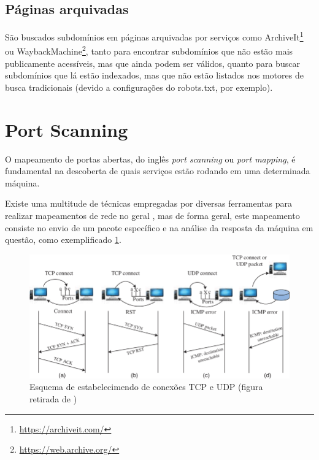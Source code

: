         \subsection{Páginas arquivadas} São buscados subdomínios em páginas arquivadas por serviços como ArchiveIt\footnote{\url{https://archiveit.com/}} ou WaybackMachine\footnote{\url{https://web.archive.org/}}, tanto para encontrar subdomínios que não estão mais publicamente acessíveis, mas que ainda podem ser válidos, quanto para buscar subdomínios que lá estão indexados, mas que não estão listados nos motores de busca tradicionais (devido a configurações do robots.txt, por exemplo).


\section{Port Scanning}

O mapeamento de portas abertas, do inglês \textit{port scanning} ou \textit{port mapping}, é fundamental na descoberta de quais serviços estão rodando em uma determinada máquina. 

Existe uma multitude de técnicas empregadas por diversas ferramentas para realizar mapeamentos de rede no geral \citep{de1999review}, mas de forma geral, este mapeamento consiste no envio de um pacote específico e na análise da resposta da máquina em questão, como exemplificado 
\ref{fig:tcpudp}.

\begin{figure}[H]
    \includegraphics[scale=0.5]{figuras/tcp_connection_scheme.png}
    \caption{Esquema de estabelecimendo de conexões TCP e UDP (figura retirada de \cite{tcpudpscans}) \label{fig:tcpudp}}
\end{figure}



